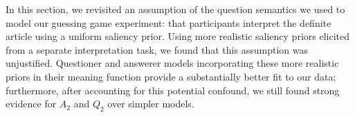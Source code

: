 \documentclass[12pt, floatsintext, jou]{apa6}
\begin{document}





In this section, we revisited an assumption of the question semantics we used to model our guessing game experiment: that participants interpret the definite article using a uniform saliency prior. Using more realistic saliency priors elicited from a separate interpretation task, we found that this assumption was unjustified. Questioner and answerer models incorporating these more realistic priors in their meaning function provide a substantially better fit to our data; furthermore, after accounting for this potential confound, we still found strong evidence for $A_2$ and $Q_2$ over simpler models.

\end{document}
